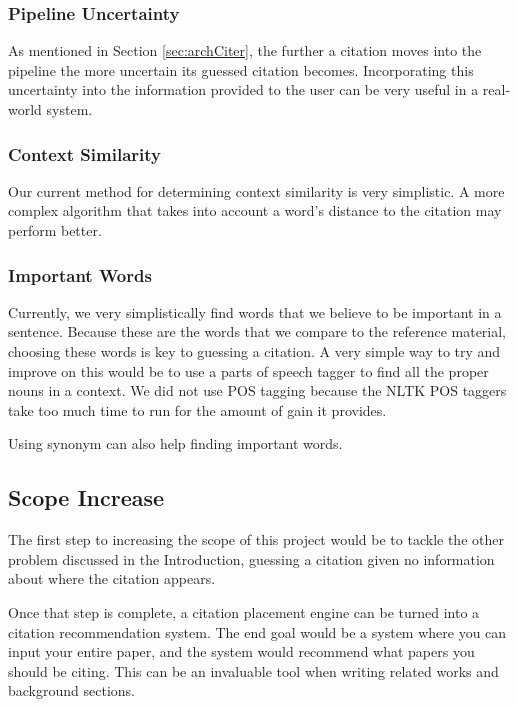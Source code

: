 \documentclass[10pt, conference, compsocconf]{IEEEtran}
\begin{document}
\subsubsection{Pipeline Uncertainty}
As mentioned in Section \ref{sec:archCiter}, the further a citation moves into the pipeline the more uncertain its guessed citation becomes.
Incorporating this uncertainty into the information provided to the user can be very useful in a real-world system.

\subsubsection{Context Similarity}
Our current method for determining context similarity is very simplistic. A more complex algorithm that takes into account a word's distance to the
citation may perform better.

\subsubsection{Important Words}
Currently, we very simplistically find words that we believe to be important in a sentence. Because these are the words that
we compare to the reference material, choosing these words is key to guessing a citation. A very simple way to try and improve on this
would be to use a parts of speech tagger to find all the proper nouns in a context. We did not use POS tagging because
the NLTK POS taggers take too much time to run for the amount of gain it provides.

Using synonym can also help finding important words.

\subsection{Scope Increase}
The first step to increasing the scope of this project would be to tackle the other problem discussed in the Introduction,
guessing a citation given no information about where the citation appears.

Once that step is complete, a citation placement engine can be turned into a citation recommendation system.
The end goal would be a system where you can input your entire paper, and the system would recommend what papers
you should be citing. This can be an invaluable tool when writing related works and background sections.
\end{document}
